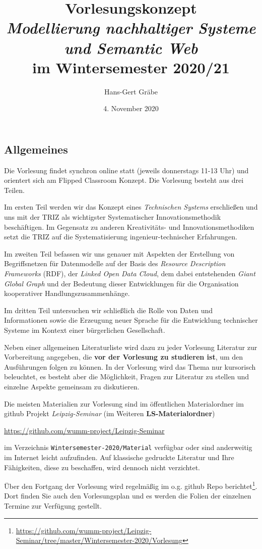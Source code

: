 \documentclass[11pt,a4paper]{article}
\title{Vorlesungskonzept \\[1em] \emph{Modellierung nachhaltiger Systeme und
    Semantic Web} \\[1em] im Wintersemester 2020/21}
\author{Hans-Gert Gr\"abe}
\date{4. November 2020}
\begin{document}
\maketitle
\subsection{Allgemeines}

Die Vorlesung findet synchron online statt (jeweils donnerstags 11-13 Uhr) und
orientert sich am Flipped Classroom Konzept. Die Vorlesung besteht aus drei
Teilen.

Im ersten Teil werden wir das Konzept eines \emph{Technischen Systems}
erschließen und uns mit der TRIZ als wichtigster Systematischer
Innovationsmethodik beschäftigen.  Im Gegensatz zu anderen Kreativitäts- und
Innovationsmethodiken setzt die TRIZ auf die Systematisierung
ingenieur-technischer Erfahrungen. 

Im zweiten Teil befassen wir uns genauer mit Aspekten der Erstellung von
Begriffsnetzen für Datenmodelle auf der Basis des \emph{Resource Description
  Frameworks} (RDF), der \emph{Linked Open Data Cloud}, dem dabei entstehenden
\emph{Giant Global Graph} und der Bedeutung dieser Entwicklungen für die
Organisation kooperativer Handlungszusammenhänge.

Im dritten Teil untersuchen wir schließlich die Rolle von Daten und
Informationen sowie die Erzeugung neuer Sprache für die Entwicklung
technischer Systeme im Kontext einer bürgerlichen Gesellschaft.

Neben einer allgemeinen Literaturliste wird dazu zu jeder Vorlesung Literatur
zur Vorbereitung angegeben, die \textbf{vor der Vorlesung zu studieren ist},
um den Ausführungen folgen zu können. In der Vorlesung wird das Thema nur
kursorisch beleuchtet, es besteht aber die Möglichkeit, Fragen zur Literatur
zu stellen und einzelne Aspekte gemeinsam zu diskutieren.

Die meisten Materialien zur Vorlesung sind im öffentlichen Materialordner im
github Projekt \emph{Leipzig-Seminar} (im Weiteren \textbf{LS-Materialordner})
\begin{center}
  \url{https://github.com/wumm-project/Leipzig-Seminar}
\end{center}
im Verzeichnis \texttt{Wintersemester-2020/Material} verfügbar oder sind
anderweitig im Internet leicht aufzufinden. Auf klassische gedruckte Literatur
und Ihre Fähigkeiten, diese zu beschaffen, wird dennoch nicht verzichtet.

Über den Fortgang der Vorlesung wird regelmäßig im o.g. github Repo
berichtet\footnote{\url{https://github.com/wumm-project/Leipzig-Seminar/tree/master/Wintersemester-2020/Vorlesung}}.
Dort finden Sie auch den Vorlesungsplan und es werden die Folien der einzelnen
Termine zur Verfügung gestellt.
\end{document}
